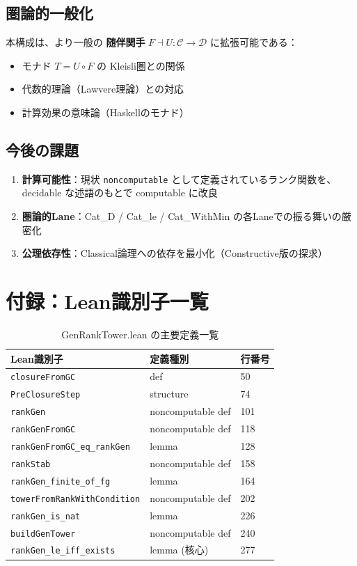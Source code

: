 \documentclass[a4paper,12pt]{ltjsarticle}
\newcommand{\Lean}[1]{\texttt{\color{blue}#1}}
\begin{document}
\subsection{圏論的一般化}

本構成は、より一般の \textbf{随伴関手} $F \dashv U : \mathcal{C} \to \mathcal{D}$ に拡張可能である：
\begin{itemize}
  \item モナド $T = U \circ F$ の Kleisli圏との関係
  \item 代数的理論（Lawvere理論）との対応
  \item 計算効果の意味論（Haskellのモナド）
\end{itemize}

\subsection{今後の課題}

\begin{enumerate}
  \item \textbf{計算可能性}：現状 \texttt{noncomputable} として定義されているランク関数を、decidable な述語のもとで computable に改良
  \item \textbf{圏論的Lane}：Cat\_D / Cat\_le / Cat\_WithMin の各Laneでの振る舞いの厳密化
  \item \textbf{公理依存性}：Classical論理への依存を最小化（Constructive版の探求）
\end{enumerate}

\section{付録：Lean識別子一覧}

\begin{table}[h]
\centering
\begin{tabular}{|l|l|l|}
\hline
\textbf{Lean識別子} & \textbf{定義種別} & \textbf{行番号} \\ \hline
\Lean{closureFromGC} & def & 50 \\ \hline
\Lean{PreClosureStep} & structure & 74 \\ \hline
\Lean{rankGen} & noncomputable def & 101 \\ \hline
\Lean{rankGenFromGC} & noncomputable def & 118 \\ \hline
\Lean{rankGenFromGC\_eq\_rankGen} & lemma & 128 \\ \hline
\Lean{rankStab} & noncomputable def & 158 \\ \hline
\Lean{rankGen\_finite\_of\_fg} & lemma & 164 \\ \hline
\Lean{towerFromRankWithCondition} & noncomputable def & 202 \\ \hline
\Lean{rankGen\_is\_nat} & lemma & 226 \\ \hline
\Lean{buildGenTower} & noncomputable def & 240 \\ \hline
\Lean{rankGen\_le\_iff\_exists} & lemma (核心) & 277 \\ \hline
\end{tabular}
\caption{GenRankTower.lean の主要定義一覧}
\end{table}
\end{document}
